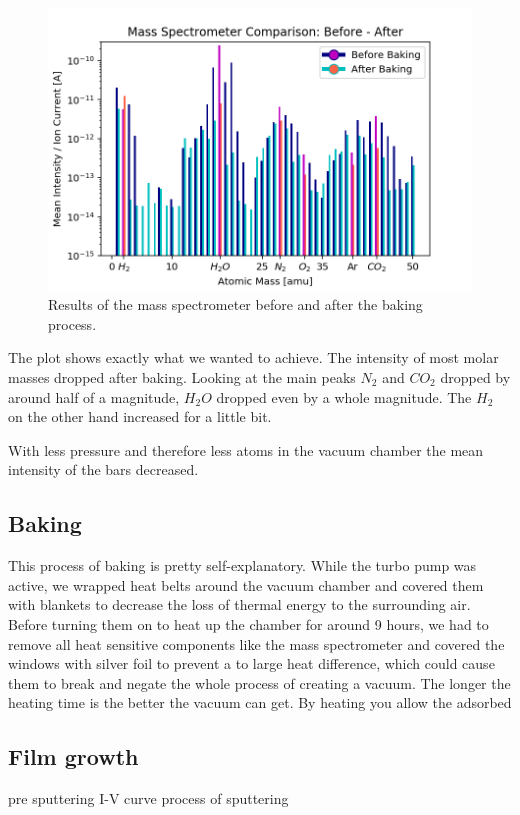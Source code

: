 \documentclass[]{article}
\begin{document}
\begin{figure}[h]
\centering\includegraphics[width=1\textwidth]{Plots/BeforeAfter.png}
\caption{Results of the mass spectrometer before and after the baking process.}
\label{fig::BeforeAfter}
\end{figure}

The plot shows exactly what we wanted to achieve. The intensity of most molar masses dropped after baking. Looking at the main peaks $N_2$ and $CO_2$ dropped by around half of a magnitude,  $H_2O$ dropped even by a whole magnitude. The $H_2$ on the other hand increased for a little bit.

With less pressure and therefore less atoms in the vacuum chamber the mean intensity of the bars decreased. 

\subsection{Baking}
This process of baking is pretty self-explanatory. While the turbo pump was active, we wrapped heat belts around the vacuum chamber and covered them with blankets to decrease the loss of thermal energy to the surrounding air. Before turning them on to heat up the chamber for around 9 hours, we had to remove all heat sensitive components like the mass spectrometer and covered the windows with silver foil to prevent a to large heat difference, which could cause them to break and negate the whole process of creating a vacuum.
The longer the heating time is the better the vacuum can get. By heating you allow the adsorbed 

\subsection{Film growth}
pre sputtering
I-V curve 
process of sputtering 
\end{document}
